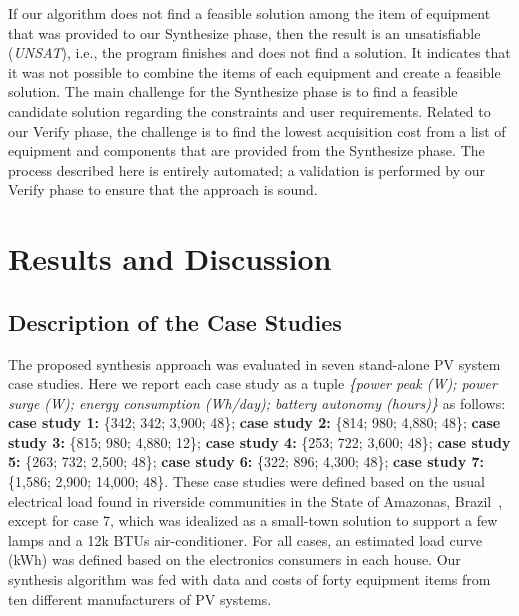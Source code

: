 \documentclass[runningheads]{llncs}
\begin{document}
If our algorithm does not find a feasible solution among the item of equipment that was provided to our {\sc Synthesize} phase, then the result is an unsatisfiable (\textit{UNSAT}), i.e., the program finishes and does not find a solution. It indicates that it was not possible to combine the items of each equipment and create a feasible solution. The main challenge for the {\sc Synthesize} phase is to find a feasible candidate solution regarding the constraints and user requirements. Related to our {\sc Verify} phase, the challenge is to find the lowest acquisition cost from a list of equipment and components that are provided from the {\sc Synthesize} phase. 
The process described here is entirely automated; a validation is performed by our {\sc Verify} phase to ensure that the approach is sound.

\section{Results and Discussion}
\subsection{Description of the Case Studies}

The proposed synthesis approach was evaluated in seven stand-alone PV system case studies. Here we report each case study as a tuple \textit{\{power peak (W); power surge (W); energy consumption (Wh/day); battery autonomy (hours)\}} as follows:
\textbf{case study 1:} \{342; 342; 3,900; 48\}; \textbf{case study 2:} \{814; 980; 4,880; 48\}; \textbf{case study 3:} \{815; 980; 4,880; 12\}; \textbf{case study 4:} \{253; 722; 3,600; 48\}; \textbf{case study 5:} \{263; 732; 2,500; 48\}; \textbf{case study 6:} \{322; 896; 4,300; 48\}; \textbf{case study 7:} \{1,586; 2,900; 14,000; 48\}.
These case studies were defined based on the usual electrical load found in riverside communities in the State of Amazonas, Brazil~\cite{TrindadeCordeiro19,Agrener2013}, except for case 7, which was idealized as a small-town solution to support a few lamps and a 12k BTUs air-conditioner. For all cases, an estimated load curve (kWh) was defined based on the electronics consumers in each house. Our synthesis algorithm was fed with data and costs of forty equipment items from ten different manufacturers of PV systems. 
\end{document}
